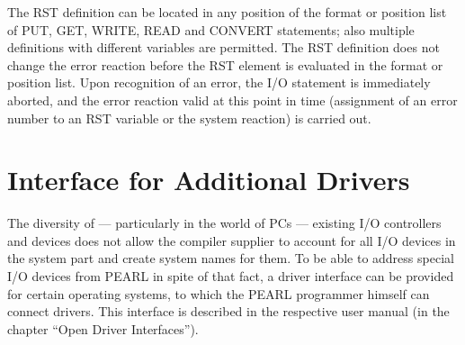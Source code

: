 The RST definition can be located in any position of the format or
position list of PUT, GET, WRITE, READ and CONVERT statements; also
multiple definitions with different variables are permitted. The RST
definition does not change the error reaction before the RST element is
evaluated in the format or position list. Upon recognition of an error,
the I/O statement is immediately aborted, and the error reaction valid
at this point in time (assignment of an error number to an RST variable
or the system reaction) is carried out.

\section{Interface for Additional Drivers}   %
\label{sec_driver_interface}

The diversity of --- particularly in the world of PCs --- existing I/O
controllers and devices does not allow the compiler supplier to account
for all I/O devices in the system part and create system names for them.
To be able to address special I/O devices from PEARL in spite of that
fact, a driver interface can be provided for certain operating systems,
to which the PEARL programmer himself can connect drivers. This
interface is described in the respective user manual (in the chapter
``Open Driver Interfaces'').

